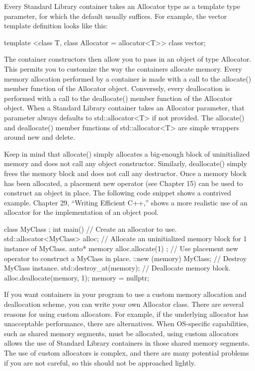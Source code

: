 Every Standard Library container takes an Allocator type as a template type parameter, for which the default usually suffices. For example, the vector template definition looks like this:

\begin{cpp}
template <class T, class Allocator = allocator<T>> class vector;
\end{cpp}

The container constructors then allow you to pass in an object of type Allocator. This permits you to customize the way the containers allocate memory. Every memory allocation performed by a container is made with a call to the allocate() member function of the Allocator object. Conversely, every deallocation is performed with a call to the deallocate() member function of the Allocator object. When a Standard Library container takes an Allocator parameter, that parameter always defaults to std::allocator<T> if not provided. The allocate() and deallocate() member functions of std::allocator<T> are simple wrappers around new and delete.

Keep in mind that allocate() simply allocates a big-enough block of uninitialized memory and does not call any object constructor. Similarly, deallocate() simply frees the memory block and does not call any destructor. Once a memory block has been allocated, a placement new operator (see Chapter 15) can be used to construct an object in place. The following code snippet shows a contrived example. Chapter 29, “Writing Efficient C++,” shows a more realistic use of an allocator for the implementation of an object pool.

\begin{cpp}
class MyClass {};
int main()
{
    // Create an allocator to use.
    std::allocator<MyClass> alloc;
    // Allocate an uninitialized memory block for 1 instance of MyClass.
    auto* memory { alloc.allocate(1) };
    // Use placement new operator to construct a MyClass in place.
    ::new (memory) MyClass{};
    // Destroy MyClass instance.
    std::destroy_at(memory);
    // Deallocate memory block.
    alloc.deallocate(memory, 1);
    memory = nullptr;
}
\end{cpp}

If you want containers in your program to use a custom memory allocation and deallocation scheme, you can write your own Allocator class. There are several reasons for using custom allocators. For example, if the underlying allocator has unacceptable performance, there are alternatives. When OS-specific capabilities, such as shared memory segments, must be allocated, using custom allocators allows the use of Standard Library containers in those shared memory segments. The use of custom allocators is complex, and there are many potential problems if you are not careful, so this should not be approached lightly.

